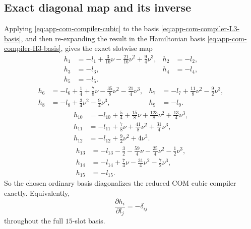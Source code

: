 \documentclass[11pt]{article}
\begin{document}
\subsection{Exact diagonal map and its inverse}
\label{app:com-compiler-map}

Applying \eqref{eq:app-com-compiler-cubic} to the basis
\eqref{eq:app-com-compiler-L3-basis}, and then re-expanding the result in the
Hamiltonian basis \eqref{eq:app-com-compiler-H3-basis}, gives the exact slotwise
map
\begin{equation}
\begin{aligned}
 h_1 &= -l_1+\frac{3}{16}\nu-\frac{21}{16}\nu^2+\frac94\nu^3,
 & h_2 &= -l_2,
\\
 h_3 &= -l_3,
 & h_4 &= -l_4,
\\
 h_5 &= -l_5.
\end{aligned}
\label{eq:app-com-compiler-forward-1}
\end{equation}
\begin{equation}
\begin{aligned}
 h_6 &= -l_6+\frac14+\frac78\nu-\frac{35}{8}\nu^2-\frac{21}{4}\nu^3,
 & h_7 &= -l_7+\frac{11}{8}\nu^2-\frac92\nu^3,
\\
 h_8 &= -l_8+\frac34\nu^2-\frac94\nu^3,
 & h_9 &= -l_9.
\end{aligned}
\label{eq:app-com-compiler-forward-2}
\end{equation}
\begin{equation}
\begin{aligned}
 h_{10} &= -l_{10}+\frac54+\frac{15}{8}\nu+\frac{123}{8}\nu^2+\frac{13}{4}\nu^3,
\\
 h_{11} &= -l_{11}+\frac78\nu+\frac{41}{8}\nu^2+\frac{31}{4}\nu^3,
\\
 h_{12} &= -l_{12}+\frac92\nu^2+4\nu^3.
\end{aligned}
\label{eq:app-com-compiler-forward-3}
\end{equation}
\begin{equation}
\begin{aligned}
 h_{13} &= -l_{13}-\frac32-\frac{59}{4}\nu-\frac{25}{4}\nu^2-\frac12\nu^3,
\\
 h_{14} &= -l_{14}+\frac74\nu-\frac{31}{4}\nu^2-\frac72\nu^3,
\\
 h_{15} &= -l_{15}.
\end{aligned}
\label{eq:app-com-compiler-forward-4}
\end{equation}
So the chosen ordinary basis diagonalizes the reduced COM cubic compiler exactly.
Equivalently,
\begin{equation}
\frac{\partial h_i}{\partial l_j}=-\delta_{ij}
\label{eq:app-com-compiler-jacobian}
\end{equation}
throughout the full $15$-slot basis.
\end{document}
